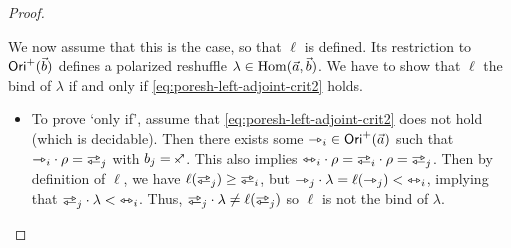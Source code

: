 \documentclass[a4paper]{memoir}
\begin{document}
\begin{proof}
\begin{enumerate}
		We now assume that this is the case, so that $\ell$ is defined.
		Its restriction to ${\mathsf{Ori}}^+(\vec b)$ defines a polarized reshuffle $\lambda \in {\mathrm{Hom}}(\vec a, \vec b)$.
		We have to show that $\ell$ the bind of $\lambda$ if and only if \cref{eq:poresh-left-adjoint-crit2} holds.
		\begin{itemize}
			\item To prove `only if', assume that \cref{eq:poresh-left-adjoint-crit2} does not hold (which is decidable). Then there exists some ${\rightarrowtriangle}_i \in {\mathsf{Ori}}^+(\vec a)$ such that $\jetsym_i \cdot \rho = \infrajetsym_j$ with $b_j = \ypolar$.
			This also implies $\equijetsym_i \cdot \rho = \infrajetsym_i \cdot \rho = \infrajetsym_j$.
			Then by definition of $\ell$, we have $\ell(\infrajetsym_j) \geq \infrajetsym_i$, but ${\rightarrowtriangle}_j \cdot \lambda = \ell({\rightarrowtriangle}_j) < {\leftrightarrowtriangle}_i$, implying that $\infrajetsym_j \cdot \lambda < \equijetsym_i$.
			Thus, $\infrajetsym_j \cdot \lambda \neq \ell(\infrajetsym_j)$ so $\ell$ is not the bind of $\lambda$.
			

\end{itemize}
\end{enumerate}
\end{proof}
\end{document}
